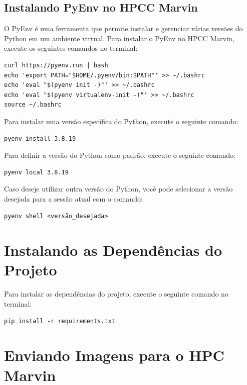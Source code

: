 \documentclass{article}
\begin{document}
\subsection{Instalando PyEnv no HPCC Marvin}

O PyEnv é uma ferramenta que permite instalar e gerenciar várias versões do Python em um ambiente virtual. Para instalar o PyEnv no HPCC Marvin, execute os seguintes comandos no terminal:

\begin{verbatim}
curl https://pyenv.run | bash
echo 'export PATH="$HOME/.pyenv/bin:$PATH"' >> ~/.bashrc
echo 'eval "$(pyenv init -)"' >> ~/.bashrc
echo 'eval "$(pyenv virtualenv-init -)"' >> ~/.bashrc
source ~/.bashrc
\end{verbatim}

Para instalar uma versão específica do Python, execute o seguinte comando:

\begin{verbatim}
pyenv install 3.8.19
\end{verbatim}

Para definir a versão do Python como padrão, execute o seguinte comando:

\begin{verbatim}
pyenv local 3.8.19
\end{verbatim}

Caso deseje utilizar outra versão do Python, você pode selecionar a versão desejada para a sessão atual com o comando:

\begin{verbatim}
pyenv shell <versão_desejada>
\end{verbatim}

\section{Instalando as Dependências do Projeto}

Para instalar as dependências do projeto, execute o seguinte comando no terminal:

\begin{verbatim}
pip install -r requirements.txt
\end{verbatim}

\section{Enviando Imagens para o HPC Marvin}
\end{document}

